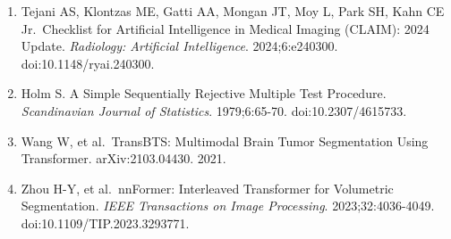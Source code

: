 \documentclass[
  10pt,
  letterpaper,
]{article}
\begin{document}
\begin{enumerate}
\item
  Tejani AS, Klontzas ME, Gatti AA, Mongan JT, Moy L, Park SH, Kahn CE
  Jr.~Checklist for Artificial Intelligence in Medical Imaging (CLAIM):
  2024 Update. \emph{Radiology: Artificial Intelligence}.
  2024;6:e240300. doi:10.1148/ryai.240300.
\item
  Holm S. A Simple Sequentially Rejective Multiple Test Procedure.
  \emph{Scandinavian Journal of Statistics}. 1979;6:65-70.
  doi:10.2307/4615733.
\item
  Wang W, et al.~TransBTS: Multimodal Brain Tumor Segmentation Using
  Transformer. arXiv:2103.04430. 2021.
\item
  Zhou H-Y, et al.~nnFormer: Interleaved Transformer for Volumetric
  Segmentation. \emph{IEEE Transactions on Image Processing}.
  2023;32:4036-4049. doi:10.1109/TIP.2023.3293771.
\end{enumerate}
\end{document}
